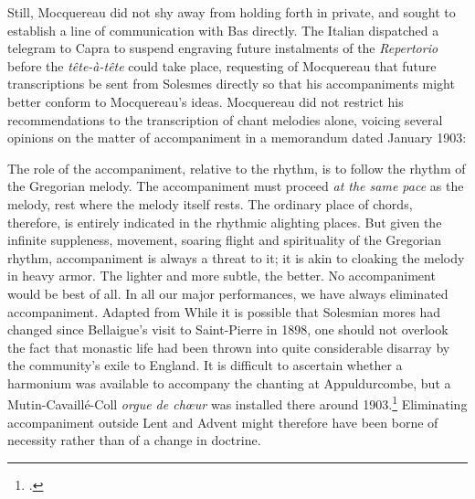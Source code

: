 Still, Mocquereau did not shy away from holding forth in private, and sought to establish a line of communication with Bas directly.
The Italian dispatched a telegram to Capra to suspend engraving future instalments of the \emph{Repertorio} before the \emph{tête-à-tête} could take place, requesting of Mocquereau that future transcriptions be sent from Solesmes directly so that his accompaniments might better conform to Mocquereau's ideas.
Mocquereau did not restrict his recommendations to the transcription of chant melodies alone, voicing several opinions on the matter of accompaniment in a memorandum dated January 1903:
\pagebreak{}

  {\cite[238--9]{CombeHistoirerestaurationchant1969}\label{fn:moc_memo1}}
{The role of the accompaniment, relative to the rhythm, is to follow the rhythm of the Gregorian melody. The accompaniment must proceed \emph{at the same pace} as the melody, rest where the melody itself rests. The ordinary place of chords, therefore, is entirely indicated in the rhythmic alighting places. But given the infinite suppleness, movement, soaring flight and spirituality of the Gregorian rhythm, accompaniment is always a threat to it; it is akin to cloaking the melody in heavy armor. The lighter and more subtle, the better. No accompaniment would be best of all. In all our major performances, we have always eliminated accompaniment.}
  {Adapted from \cite[209--210]{CombeRestorationGregorianChant2003}\label{fn:moc_memo2}}
\noindent
While it is possible that Solesmian mores had changed since Bellaigue's visit to Saint-Pierre in 1898, one should not overlook the fact that monastic life had been thrown into quite considerable disarray by the community's exile to England.
It is difficult to ascertain whether a harmonium was available to accompany the chanting at Appuldurcombe, but a Mutin-Cavaillé-Coll \emph{orgue de chœur} was installed there around 1903.\footcite[31]{HaleFrenchTreasureIsle2017}
Eliminating accompaniment outside Lent and Advent might therefore have been borne of necessity rather than of a change in doctrine.

